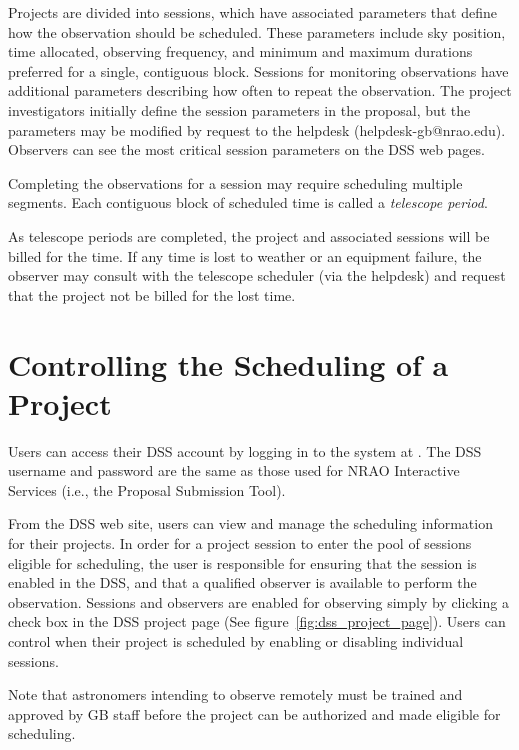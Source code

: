 Projects are divided into sessions, which have associated parameters that define how 
the observation should be scheduled. These parameters include sky position, time
allocated, observing frequency, and minimum and maximum durations preferred for a
single, contiguous block. Sessions for monitoring observations have additional
parameters describing how often to repeat the observation. The project investigators
initially define the session parameters in the proposal, but the parameters may be
modified by request to the helpdesk (helpdesk-gb@nrao.edu). Observers can see the
most critical session parameters on the \gls{DSS} web pages.

Completing the observations for a session may require scheduling multiple segments.
Each contiguous block of scheduled time is called a {\it telescope period}.

As telescope periods are completed, the project and associated sessions will be
billed for the time. If any time is lost to weather or an equipment failure, the
observer may consult with the telescope scheduler (via the helpdesk) and request
that the project not be billed for the lost time.

\section{Controlling the Scheduling of a Project}

Users can access their \gls{DSS} account by logging in to the system at 
.
The \gls{DSS} username and password are the same as those used for \gls{NRAO}
Interactive Services (i.e., the Proposal Submission Tool).

From the \gls{DSS} web site, users can view and manage the scheduling information
for their projects.  In order for a project session to enter the pool of sessions
eligible for scheduling, the user is responsible for ensuring that the session is
enabled in the \gls{DSS}, and that a qualified observer is available to perform the
observation. Sessions and observers are enabled for observing simply by clicking a
check box in the \gls{DSS} project page (See figure~\ref{fig:dss_project_page}).
Users can control when their project is scheduled by enabling or disabling
individual sessions.

Note that astronomers intending to observe remotely must be trained and approved by
GB staff before the project can be authorized and made eligible for scheduling.

